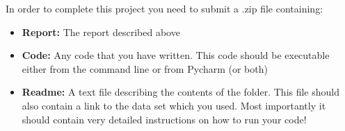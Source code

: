 \documentclass[11pt, leqno, a4paper]{article}
\begin{document}
In order to complete this project you need to submit a .zip file containing:
\begin{itemize}
\item \textbf{Report:} The report described above
\item \textbf{Code:} Any code that you have written. This code should be executable either from the command line or from Pycharm (or both)
\item \textbf{Readme:} A text file describing the contents of the folder. This file should also contain a link to the data set which you used. Most importantly
it should contain very detailed instructions on how to run your code!
\end{itemize}
\end{document}
